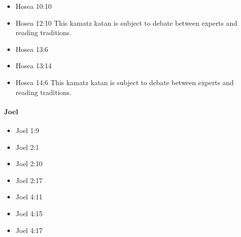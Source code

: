 \documentclass[14pt]{article}
\begin{document}
\begin{multicols}{2}
\begin{itemize}
																\item Hosea 10:10
																
																\item Hosea 12:10 This kamatz katan is subject to debate between experts and reading traditions.
																
																\item Hosea 13:6
																
																\item Hosea 13:14
																
																\item Hosea 14:6 This kamatz katan is subject to debate between experts and reading traditions.
																
															\end{itemize}\end{multicols}
														\paragraph{Joel}
													\begin{multicols}{2}\begin{itemize}
																
																\item Joel 1:9
																
																\item Joel 2:1
																
																\item Joel 2:10
																
																\item Joel 2:17
																
																\item Joel 4:11
																
																\item Joel 4:15
																
																\item Joel 4:17
																
																								\end{itemize}\end{multicols}
\end{document}
